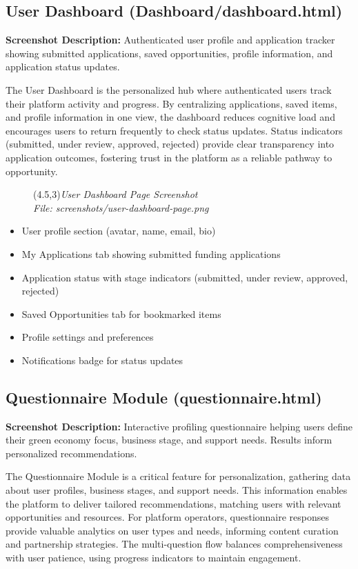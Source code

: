 \documentclass[a4paper,12pt]{article}
\begin{document}
\subsection{User Dashboard (Dashboard/dashboard.html)}
\textbf{Screenshot Description:} Authenticated user profile and application tracker showing submitted applications, saved opportunities, profile information, and application status updates.

The User Dashboard is the personalized hub where authenticated users track their platform activity and progress. By centralizing applications, saved items, and profile information in one view, the dashboard reduces cognitive load and encourages users to return frequently to check status updates. Status indicators (submitted, under review, approved, rejected) provide clear transparency into application outcomes, fostering trust in the platform as a reliable pathway to opportunity.

\begin{figure}[h]
    \centering
    \framebox(4.5,3){\textit{User Dashboard Page Screenshot}}\\
    \small\textit{File: screenshots/user-dashboard-page.png}
\end{figure}

\begin{itemize}
    \item User profile section (avatar, name, email, bio)
    \item My Applications tab showing submitted funding applications
    \item Application status with stage indicators (submitted, under review, approved, rejected)
    \item Saved Opportunities tab for bookmarked items
    \item Profile settings and preferences
    \item Notifications badge for status updates
\end{itemize}

\subsection{Questionnaire Module (questionnaire.html)}
\textbf{Screenshot Description:} Interactive profiling questionnaire helping users define their green economy focus, business stage, and support needs. Results inform personalized recommendations.

The Questionnaire Module is a critical feature for personalization, gathering data about user profiles, business stages, and support needs. This information enables the platform to deliver tailored recommendations, matching users with relevant opportunities and resources. For platform operators, questionnaire responses provide valuable analytics on user types and needs, informing content curation and partnership strategies. The multi-question flow balances comprehensiveness with user patience, using progress indicators to maintain engagement.
\end{document}
